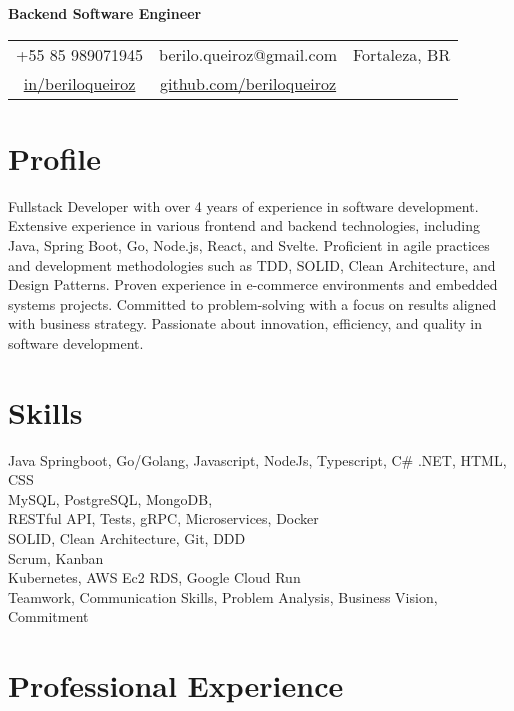 \documentclass[11pt,a4paper,sans]{moderncv}
\begin{document}
\makecvtitle
\vspace*{-16mm}
\begin{center}\textbf{ Backend Software Engineer}\end{center}
\begin{center}
	\begin{tabular}{ c c c }
		\faMobile\enspace +55 85 989071945                                                                  & \enspace berilo.queiroz@gmail.com & \enspace\faHome\enspace Fortaleza, BR \\
		\faLinkedin\enspace \color{blue} \href{https://www.linkedin.com/in/beriloqueiroz}{in/beriloqueiroz} &
		\faGithub\enspace \color{blue} \href{https://github.com/beriloqueiroz}{github.com/beriloqueiroz}    & \enspace
	\end{tabular}
\end{center}

\section{Profile}
 {
  Fullstack Developer with over 4 years of experience in software development. Extensive experience in various frontend and backend technologies, including Java, Spring Boot, Go, Node.js, React, and Svelte. Proficient in agile practices and development methodologies such as TDD, SOLID, Clean Architecture, and Design Patterns. Proven experience in e-commerce environments and embedded systems projects. Committed to problem-solving with a focus on results aligned with business strategy. Passionate about innovation, efficiency, and quality in software development.
 }

\section{Skills}
 {
  Java Springboot, Go/Golang, Javascript, NodeJs, Typescript, C\# .NET, HTML, CSS \\
  MySQL, PostgreSQL, MongoDB, \\
  RESTful API, Tests, gRPC, Microservices, Docker\\
  SOLID, Clean Architecture, Git, DDD \\
  Scrum, Kanban\\
  Kubernetes, AWS Ec2 RDS, Google Cloud Run\\
  Teamwork, Communication Skills, Problem Analysis, Business Vision, Commitment\\
 }

\section{Professional Experience}
\end{document}
